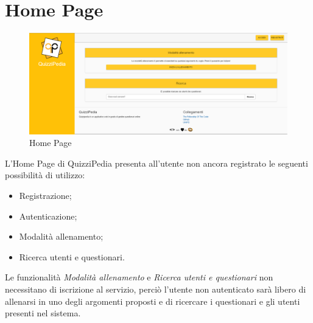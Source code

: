 \newpage
\section{Home Page}

\label{Home Page}
\begin{figure}[ht]
	\centering
	\includegraphics[scale=0.45]{img/homePage.png}
	\caption{Home Page}
\end{figure}
\FloatBarrier

L'Home Page di QuizziPedia presenta all'utente non ancora registrato le seguenti possibilità di utilizzo:
\begin{itemize}
	\item Registrazione;
	\item Autenticazione;
	\item Modalità allenamento;
	\item Ricerca utenti e questionari.
\end{itemize}
Le funzionalità \textit{Modalità allenamento} e \textit{Ricerca utenti e questionari} non necessitano di iscrizione al servizio, perciò l'utente non autenticato sarà libero di allenarsi in uno degli argomenti proposti e di ricercare i questionari e gli utenti presenti nel sistema.